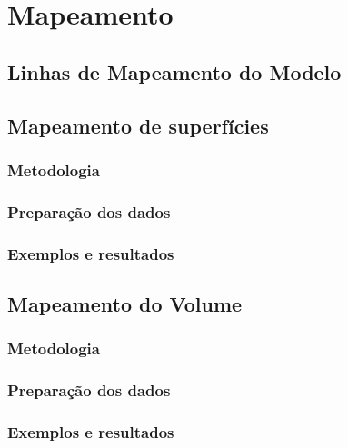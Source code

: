 
\chapter{Mapeamento}

\section{Linhas de Mapeamento do Modelo}

\section{Mapeamento de superfícies}

\subsection{Metodologia}

\subsection{Preparação dos dados}

\subsection{Exemplos e resultados}

\section{Mapeamento do Volume}

\subsection{Metodologia}

\subsection{Preparação dos dados}

\subsection{Exemplos e resultados}


